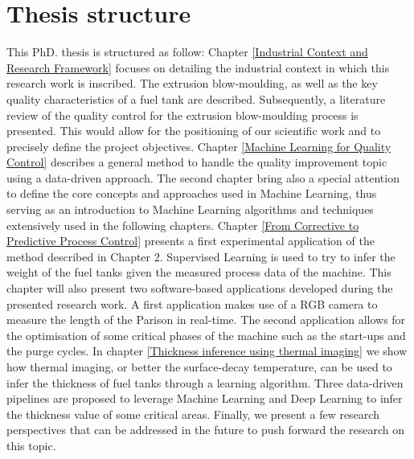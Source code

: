 \section*{Thesis structure}

This PhD. thesis is structured as follow: Chapter \ref{Industrial Context and Research Framework} focuses on detailing the industrial context in which this research work is inscribed. The extrusion blow-moulding, as well as the key quality characteristics of a fuel tank are described. Subsequently, a literature review of the quality control for the extrusion blow-moulding process is presented. This would allow for the positioning of our scientific work and to precisely define the project objectives. Chapter \ref{Machine Learning for Quality Control} describes a general method to handle the quality improvement topic using a data-driven approach. The second chapter bring also a special attention to define the core concepts and approaches used in Machine Learning, thus serving as an introduction to Machine Learning algorithms and techniques extensively used in the following chapters. Chapter \ref{From Corrective to Predictive Process Control} presents a first experimental application of the method described in Chapter 2. Supervised Learning is used  to try to infer the weight of the fuel tanks given the measured process data of the machine. This chapter will also present two software-based applications developed during the presented research work. A first application makes use of a RGB camera to measure the length of the Parison in real-time. The second application allows for the optimisation of some critical phases of the machine such as the start-ups and the purge cycles. In chapter \ref{Thickness inference using thermal imaging} we show how thermal imaging, or better the surface-decay temperature, can be used to infer the thickness of fuel tanks through a learning algorithm. Three data-driven pipelines are proposed to leverage Machine Learning and Deep Learning to infer the thickness value of some critical areas. Finally, we present a few research perspectives that can be addressed in the future to push forward the research on this topic.  

\clearpage